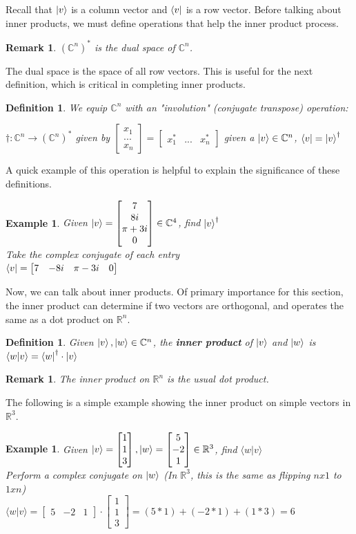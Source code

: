 \documentclass[12pt]{article}
\theoremstyle{plain}
\theoremstyle{nonumberplain}
\theoremstyle{plain}
\newtheorem{definition}[lemma]{Definition}
\newtheorem{example}[lemma]{Example}
\newtheorem{remark}[lemma]{Remark}
\theoremstyle{nonumberplain}
\newcommand\1{{\bf 1}}
\newcommand{\bmat}[1]{\begin{bmatrix*} #1 \end{bmatrix*}} %
\newcommand{\R}{\mathbb{R}} %
\newcommand{\C}{\mathbb{C}} %
\newcommand{\<}{\left\langle}
\renewcommand{\>}{\right\rangle}
\begin{document}
Recall that $\ket{v}$ is a column vector and $\bra{v}$ is a row vector. Before talking about inner products, we must define operations that help the inner product process.
\begin{remark}
$(\C^n)^*$ is the \textit{dual space} of $\C^n$.
\end{remark}
The dual space is the space of all row vectors. This is useful for the next definition, which is critical in completing inner products.
\begin{definition}
We equip $\C^n$ with an "involution" (\textit{conjugate transpose}) operation:
\begin{center}
$\dagger:\C^n\longrightarrow(\C^n)^*$ given by $\bmat{x_1 \\ ... \\ x_n}=\bmat{x_1^* & ... & x_n^*}$ given a $\ket{v}\in\C^n$, $\bra{v}=\ket{v}^\dagger$
\end{center}
\end{definition}
A quick example of this operation is helpful to explain the significance of these definitions.
\begin{example}
Given $\ket{v}=\bmat{7 \\ 8i \\ \pi + 3i \\ 0}\in\C^4$, find $\ket{v}^\dagger$\\
Take the complex conjugate of each entry \\
$\bra{v}=\bmat{7 & -8i & \pi-3i & 0}$
\end{example}
Now, we can talk about inner products. Of primary importance for this section, the inner product can determine if two vectors are orthogonal, and operates the same as a dot product on $\R^n$.
\begin{definition}
Given $\ket{v}, \ket{w}\in\C^n$, the \textbf{inner product} of $\ket{v}$ and $\ket{w}$ is $\langle w|v \rangle=\bra{w}^\dagger\cdot\ket{v}$
\end{definition}
\begin{remark}
The inner product on $\R^n$ is the usual dot product.
\end{remark}
The following is a simple example showing the inner product on simple vectors in $\R^3$.
\begin{example}
Given $\ket{v}=\bmat{1 \\ 1\\ 3}, \ket{w}=\bmat{5 \\ -2 \\ 1}\in\R^3$, find $\langle w|v \rangle$ \\
\indent Perform a complex conjugate on $\ket{w}$ (In $\R^3$, this is the same as flipping $nx1$ to $1xn$) \\
\indent $\langle w|v \rangle=\bmat{5 & -2 & 1}\cdot\bmat{1 \\ 1 \\ 3}=(5*1)+(-2*1)+(1*3)=6$
\end{example}
\end{document}
